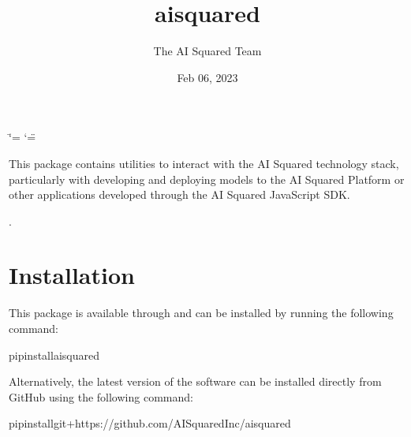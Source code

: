 \documentclass[letterpaper,10pt,english]{sphinxmanual}
\title{aisquared}
\date{Feb 06, 2023}
\author{The AI Squared Team}
\let\sphinxpxdimen\pdfpxdimen\else\newdimen\sphinxpxdimen
\begin{document}
\ifdefined\shorthandoff
  \ifnum\catcode`\=\string=\active\shorthandoff{=}\fi
  \ifnum\catcode`\"=\active{}\fi
\fi

\pagestyle{empty}
\sphinxmaketitle
\pagestyle{plain}
\sphinxtableofcontents
\pagestyle{normal}
\label{\detokenize{index::doc}}
\noindent{\hspace*{\fill}\sphinxincludegraphics[width=400\sphinxpxdimen]{{aisquared}.png}\hspace*{\fill}}

\begin{DUlineblock}{0em}
\item[] 
\item[] 
\end{DUlineblock}



\sphinxAtStartPar
This package contains utilities to interact with the AI Squared technology stack, particularly with developing and deploying models to the AI Squared Platform or other applications developed through the AI Squared JavaScript SDK.

\sphinxAtStartPar
{} 

\sphinxAtStartPar
{}.

\begin{DUlineblock}{0em}
\item[] 
\end{DUlineblock}


\chapter{Installation}
\label{\detokenize{index:installation}}
\sphinxAtStartPar
This package is available through  and can be installed by running the following command:

\begin{sphinxVerbatim}[commandchars=\\\{\}]
pipinstallaisquared
\end{sphinxVerbatim}

\sphinxAtStartPar
Alternatively, the latest version of the software can be installed directly from GitHub using the following command:

\begin{sphinxVerbatim}[commandchars=\\\{\}]
pipinstallgit+https://github.com/AISquaredInc/aisquared
\end{sphinxVerbatim}
\end{document}

